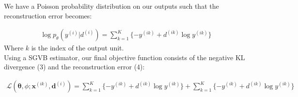 \documentclass{article}
\begin{document}
We have a Poisson probability distribution on our outputs such that the reconstruction error becomes:

\begin{align}
\log p_{\theta}(y^{(i)}|d^{(i)}) = \sum_{k=1}^K\{-y^{(ik)} + d^{(ik)} \log{y^{(ik)}}\}
\end{align}
Where $k$ is the index of the output unit.\\


Using a SGVB estimator, our final objective function consists of the negative KL divergence (3) and the reconstruction error (4):

\begin{align}
\mathcal{L}(\mathbf{\theta}, \phi; \mathbf{x}^{(ik)},
 \mathbf{d}^{(i)}) = \sum_{k=1}^K\{-y^{(ik)} + d^{(ik)} \log{y^{(ik)}}\} + \sum_{k=1}^K\{-y^{(ik)} + d^{(ik)} \log{y^{(ik)}}\}
\end{align}
\end{document}

